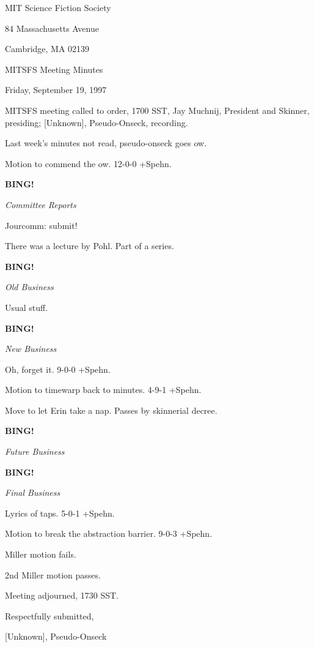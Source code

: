 \documentclass[12pt]{article}
\newcommand{\bing}{{\bf BING!} }
\newcommand{\goto}[1]{\bing \vskip 12pt \centerline{{\em{#1}}}}
\begin{document}
\begin{center}

MIT Science Fiction Society 

84 Massachusetts Avenue

Cambridge, MA 02139

\vspace{12pt}

MITSFS Meeting Minutes 

Friday, September 19, 1997

\end{center}
 
\vspace{18pt}

\setlength{\parskip}{6pt}

\noindent
MITSFS meeting called to order, 1700 SST,
Jay Muchnij, President and Skinner, presiding; [Unknown], Pseudo-Onseck, recording.

Last week's minutes not read, pseudo-onseck goes ow.

Motion to commend the ow. 12-0-0 +Spehn.

\goto{Committee Reports}

Jourcomm: submit!

There was a lecture by Pohl. Part of a series.

\goto{Old Business}

Usual stuff.

\goto{New Business}

Oh, forget it. 9-0-0 +Spehn.

Motion to timewarp back to minutes. 4-9-1 +Spehn.

Move to let Erin take a nap. Passes by skinnerial decree.

\goto{Future Business}

\goto{Final Business}

Lyrics of taps. 5-0-1 +Spehn.

Motion to break the abstraction barrier. 9-0-3 +Spehn.

Miller motion fails.

2nd Miller motion passes.

\vspace{12pt}

\noindent
Meeting adjourned, 1730 SST.

\vspace{18pt}

\centerline{Respectfully submitted,}
\centerline{[Unknown], Pseudo-Onseck}
\end{document}
